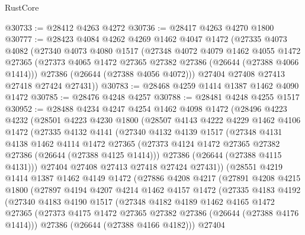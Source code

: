 \begin{lexlean}{RustCore}
\begin{coremodule}
@30733 := @28412 @4263 @4272
@30736 := @28417 @4263 @4270 @1800
@30777 := @28423
    @4084
    @4262
    @4269
    @1462
    @4047
    @1472
    (@27335
      @4073
      @4082
      (@27340
        @4073
        @4080
        @1517
        (@27348
          @4072
          @4079
          @1462
          @4055
          @1472
          @27365
          (@27373 @4065 @1472 @27365 @27382 @27386 (@26644 (@27388 @4066 @1414)))
          @27386
          (@26644 (@27388 @4056 @4072)))
        @27404
        @27408
        @27413
        @27418
        @27424
        @27431))
@30783 := @28468 @4259 @1414 @1387 @1462 @4090 @1472
@30785 := @28476 @4248 @4257
@30788 := @28481 @4248 @4255 @1517
@30952 := @28488
    @4234
    @4247
    @4254
    @1462
    @4098
    @1472
    (@28496
      @4223
      @4232
      (@28501
        @4223
        @4230
        @1800
        (@28507
          @4143
          @4222
          @4229
          @1462
          @4106
          @1472
          (@27335
            @4132
            @4141
            (@27340
              @4132
              @4139
              @1517
              (@27348
                @4131
                @4138
                @1462
                @4114
                @1472
                @27365
                (@27373 @4124 @1472 @27365 @27382 @27386 (@26644 (@27388 @4125 @1414)))
                @27386
                (@26644 (@27388 @4115 @4131)))
              @27404
              @27408
              @27413
              @27418
              @27424
              @27431))
          (@28551
            @4219
            @1414
            @1387
            @1462
            @4149
            @1472
            (@27886
              @4208
              @4217
              (@27891
                @4208
                @4215
                @1800
                (@27897
                  @4194
                  @4207
                  @4214
                  @1462
                  @4157
                  @1472
                  (@27335
                    @4183
                    @4192
                    (@27340
                      @4183
                      @4190
                      @1517
                      (@27348
                        @4182
                        @4189
                        @1462
                        @4165
                        @1472
                        @27365
                        (@27373 @4175 @1472 @27365 @27382 @27386 (@26644 (@27388 @4176 @1414)))
                        @27386
                        (@26644 (@27388 @4166 @4182)))
                      @27404

\end{coremodule}
\end{lexlean}
